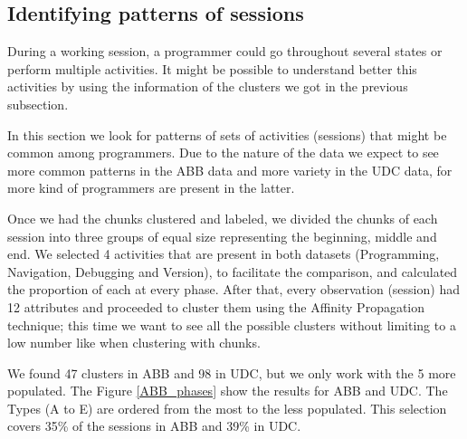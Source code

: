 \subsection{Identifying patterns of sessions}
During a working session, a programmer could go throughout several states or perform multiple activities. It might be possible to understand better this activities by using the information of the clusters we got in the previous subsection. 

In this section we look for patterns of sets of activities (sessions) that might be common among programmers. Due to the nature of the data we expect to see more common patterns in the ABB data and more variety in the UDC data, for more kind of programmers are present in the latter.

Once we had the chunks clustered and labeled, we divided the chunks of each session into three groups of equal size representing the beginning, middle and end. We selected 4 activities that are present in both datasets (Programming, Navigation, Debugging and Version), to facilitate the comparison, and calculated the proportion of each at every phase. After that, every observation (session) had 12 attributes and proceeded to cluster them using the Affinity Propagation technique; this time we want to see all the possible clusters without limiting to a low number like when clustering with chunks. 

We found 47 clusters in ABB and 98 in UDC, but we only work with the 5 more populated. The Figure \ref{ABB_phases} show the results for ABB and UDC. The Types (A to E) are ordered from the most to the less populated. This selection covers 35\% of the sessions in ABB and 39\% in UDC. 

